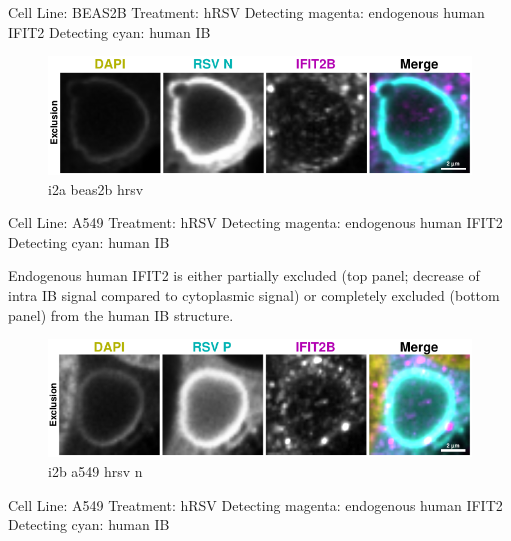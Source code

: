 Cell Line: BEAS2B \newline
Treatment: hRSV \newline
Detecting magenta: endogenous human IFIT2  \newline
Detecting cyan: human IB \newline

\begin{figure}
    \centering
    \includegraphics[width=1\linewidth]{10. Chapter 5/Figs/01. Infection/04. i2b a549 hrsv n.pdf}
    \caption[i2a beas2b hrsv]{i2a beas2b hrsv}
    \label{fig:i2a beas2b hrsv}
\end{figure}

Cell Line: A549 \newline
Treatment: hRSV \newline
Detecting magenta: endogenous human IFIT2  \newline
Detecting cyan: human IB \newline

Endogenous human IFIT2 is either partially excluded (top panel; decrease of intra IB signal compared to cytoplasmic signal) or completely excluded (bottom panel) from the human IB structure.

\begin{figure}
    \centering
    \includegraphics[width=1\linewidth]{10. Chapter 5/Figs/01. Infection/05. i2b a549 hrsv p.pdf}
    \caption[i2b a549 hrsv n]{i2b a549 hrsv n}
    \label{fig:i2b a549 hrsv n}
\end{figure}

Cell Line: A549 \newline
Treatment: hRSV \newline
Detecting magenta: endogenous human IFIT2  \newline
Detecting cyan: human IB  \newline

